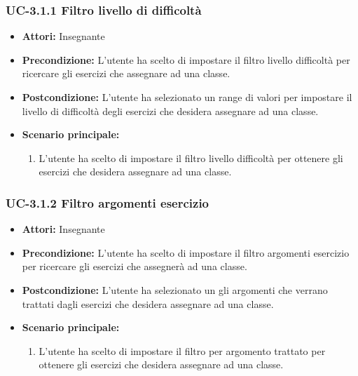 \subsubsection{UC-3.1.1 Filtro livello di difficoltà}
\begin{itemize}
		\item \textbf{Attori: } Insegnante
		
		\item \textbf{Precondizione: }L'utente ha scelto di impostare il filtro livello difficoltà per ricercare gli esercizi che assegnare ad una classe.
		\item \textbf{Postcondizione: }L'utente ha selezionato un range di valori per impostare il livello di difficoltà degli esercizi che desidera assegnare ad una classe.
		\item \textbf{Scenario principale: }
		\begin{enumerate}
			\item L'utente ha scelto di impostare il filtro livello difficoltà per ottenere gli esercizi che desidera assegnare ad una classe.
		\end{enumerate}
\end{itemize}
\subsubsection{UC-3.1.2 Filtro argomenti esercizio}
\begin{itemize}
		\item \textbf{Attori: } Insegnante
		\item \textbf{Precondizione: }L'utente ha scelto di impostare il filtro argomenti esercizio per ricercare gli esercizi che assegnerà ad una classe.
		\item \textbf{Postcondizione: }L'utente ha selezionato un gli argomenti che verrano trattati dagli esercizi che desidera assegnare ad una classe.
		\item \textbf{Scenario principale: }
		\begin{enumerate}
			\item L'utente ha scelto di impostare il filtro per argomento trattato per ottenere gli esercizi che desidera assegnare ad una classe.
		\end{enumerate}
\end{itemize}
